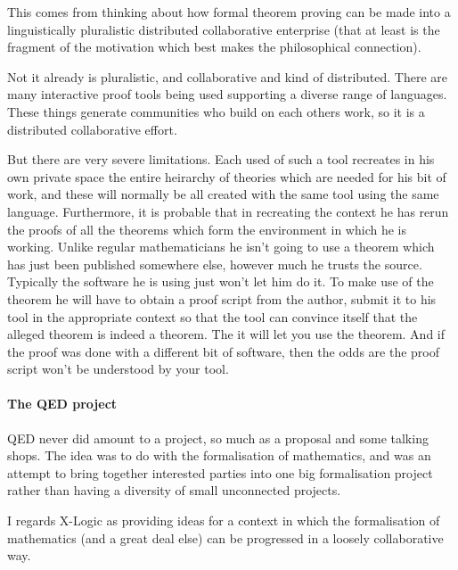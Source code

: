This comes from thinking about how formal theorem proving can be made into a linguistically pluralistic distributed collaborative enterprise (that at least is the fragment of the motivation which best makes the philosophical connection).

Not it already is pluralistic, and collaborative and kind of distributed.
There are many interactive proof tools being used supporting a diverse range of languages.
These things generate communities who build on each others work, so it is a distributed collaborative effort.

But there are very severe limitations.
Each used of such a tool recreates in his own private space the entire heirarchy of theories which are needed for his bit of work, and these will normally be all created with the same tool using the same language.
Furthermore, it is probable that in recreating the context he has rerun the proofs of all the theorems which form the environment in which he is working.
Unlike regular mathematicians he isn't going to use a theorem which has just been published somewhere else, however much he trusts the source.
Typically the software he is using just won't let him do it.
To make use of the theorem he will have to obtain a proof script from the author, submit it to his tool in the appropriate context so that the tool can convince itself that the alleged theorem is indeed a theorem.
The it will let you use the theorem.
And if the proof was done with a different bit of software, then the odds are the proof script won't be understood by your tool.

\paragraph{The QED project}

QED never did amount to a project, so much as a proposal and some talking shops.
The idea was to do with the formalisation of mathematics, and was an attempt to bring together interested parties into one big formalisation project rather than having a diversity of small unconnected projects.

I regards X-Logic as providing ideas for a context in which the formalisation of mathematics (and a great deal else) can be progressed in a loosely collaborative way.

\paragraph{}
